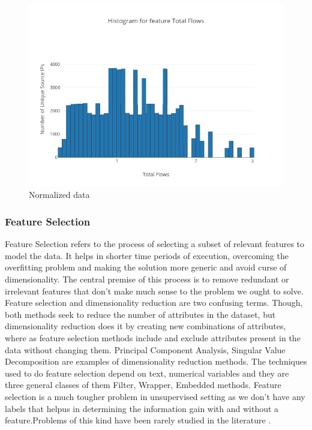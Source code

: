 \begin{figure}[t]
	\centerline{\includegraphics[scale = 0.9]{transformed.png}}
	\caption{Normalized data}%
\end{figure}



\subsubsection{Feature Selection}		
	
	Feature Selection refers to the process of selecting a subset of relevant features to model the data. It helps in shorter time periods of execution, overcoming the overfitting problem and making the solution more generic and avoid curse of dimensionality. The central premise of this process is to remove redundant or irrelevant features that don't make much sense to the problem we ought to solve. Feature selection and dimensionality reduction are two confusing terms. Though, both methods seek to reduce the number of attributes in the dataset, but dimensionality reduction does it by creating new combinations of attributes, where as feature selection methods include and exclude attributes present in the data without changing them. Principal Component Analysis, Singular Value Decomposition are examples of dimensionality reduction methods. The techniques used to do feature selection depend on text, numerical variables and they are three general classes of them Filter, Wrapper, Embedded methods.	Feature selection is a much tougher problem in unsupervised setting as we don't have any labels that helpus in determining the information gain with and without a feature.Problems of
	this kind have been rarely studied in the literature \cite{boutsidis2009unsupervised} \cite{dash2002feature}. 
	
